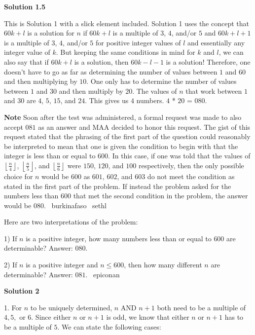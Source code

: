 \begin{enumerate}
 



\textbf{Solution 1.5}

This is Solution 1 with a slick element included.  Solution 1 uses the concept that $60k+l$ is a solution for $n$ if $60k+l$ is a multiple of $3$, $4$, and/or $5$ and $60k+l+1$ is a multiple of $3$, $4$, and/or $5$ for positive integer values of $l$ and essentially any integer value of $k$.  But keeping the same conditions in mind for $k$ and $l$, we can also say that if $60k+l$ is a solution, then $60k-l-1$ is a solution!  Therefore, one doesn't have to go as far as determining the number of values between $1$ and $60$ and then multiplying by $10$.  One only has to determine the number of values between $1$ and $30$ and then multiply by $20$.  The values of $n$ that work between $1$ and $30$ are $4$, $5$, $15$, and $24$.  This gives us $4$ numbers.  $4$ * $20$ = $\boxed{080}$.

 \textbf{Note} Soon after the test was administered, a formal request was made to also accept $\boxed{081}$ as an answer and MAA decided to honor this request. The gist of this request stated that the phrasing of the first part of the question could reasonably be interpreted to mean that one is given the condition to begin with that the integer is less than or equal to $600$.  In this case, if one was told that the values of $\left\lfloor \frac n4\right\rfloor$, $\left\lfloor\frac n5\right\rfloor$, and $\left\lfloor\frac n6\right\rfloor$ were $150$, $120$, and $100$ respectively, then the only possible choice for $n$ would be $600$ as $601$, $602$, and $603$ do not meet the condition as stated in the first part of the problem. If instead the problem asked for the numbers less than $600$ that met the second condition in the problem, the answer would be $\boxed{080}$.  ~burkinafaso ~sethl 

 Here are two interpretations of the problem: 

 1) If $n$ is a positive integer, how many numbers less than or equal to $600$ are determinable? Answer: $\boxed{080}$. 

 2) If $n$ is a positive integer and $n \leq 600$, then how many different $n$ are determinable? Answer: $\boxed{081}$. ~epiconan

 



\textbf{Solution 2}

1. For $n$ to be uniquely determined, $n$ AND $n + 1$ both need to be a multiple of $4, 5,$ or $6.$ Since either $n$ or $n + 1$ is odd, we know that either $n$ or $n + 1$ has to be a multiple of $5.$ We can state the following cases: 


\end{enumerate}
